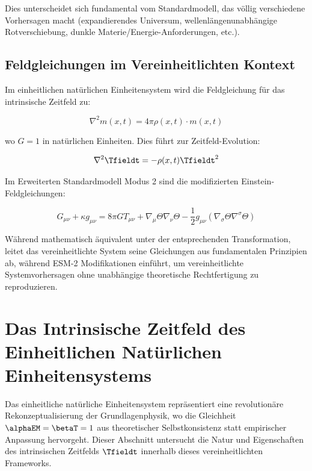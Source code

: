 	Dies unterscheidet sich fundamental vom Standardmodell, das völlig verschiedene Vorhersagen macht (expandierendes Universum, wellenlängenunabhängige Rotverschiebung, dunkle Materie/Energie-Anforderungen, etc.).
	
	\subsection{Feldgleichungen im Vereinheitlichten Kontext}
	\label{subsec:field_equations_unified}
	
	Im einheitlichen natürlichen Einheitensystem wird die Feldgleichung für das intrinsische Zeitfeld zu:
	
	\begin{equation}
		\nabla^2 m(x,t) = 4\pi \rho(x,t) \cdot m(x,t)
	\end{equation}
	
	wo $G = 1$ in natürlichen Einheiten. Dies führt zur Zeitfeld-Evolution:
	
	\begin{equation}
		\nabla^2 \Tfieldt = -\rho(x,t) \Tfieldt^2
	\end{equation}
	
	Im Erweiterten Standardmodell Modus 2 sind die modifizierten Einstein-Feldgleichungen:
	
	\begin{equation}
		G_{\mu\nu} + \kappa g_{\mu\nu} = 8\pi G T_{\mu\nu} + \nabla_{\mu}\Theta\nabla_{\nu}\Theta - \frac{1}{2}g_{\mu\nu}(\nabla_{\sigma}\Theta\nabla^{\sigma}\Theta)
	\end{equation}
	
	Während mathematisch äquivalent unter der entsprechenden Transformation, leitet das vereinheitlichte System seine Gleichungen aus fundamentalen Prinzipien ab, während ESM-2 Modifikationen einführt, um vereinheitlichte Systemvorhersagen ohne unabhängige theoretische Rechtfertigung zu reproduzieren.
	
	\section{Das Intrinsische Zeitfeld des Einheitlichen Natürlichen Einheitensystems}
	\label{sec:unified_time_field}
	
	Das einheitliche natürliche Einheitensystem repräsentiert eine revolutionäre Rekonzeptualisierung der Grundlagenphysik, wo die Gleichheit $\alphaEM = \betaT = 1$ aus theoretischer Selbstkonsistenz statt empirischer Anpassung hervorgeht. Dieser Abschnitt untersucht die Natur und Eigenschaften des intrinsischen Zeitfelds $\Tfieldt$ innerhalb dieses vereinheitlichten Frameworks.
	
